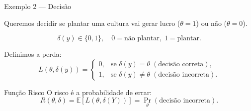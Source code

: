 \documentclass[12pt]{beamer}
\begin{document}
\begin{frame}{Exemplo 2 — Decisão}

	\begin{block}{}
		\justifying
		Queremos decidir se plantar uma cultura vai gerar lucro ($\theta=1$) ou não ($\theta=0$). 
		
		\[
		\delta(y) \in \{0,1\}, \quad 0=\text{não plantar}, \; 1=\text{plantar}.
		\]
		
		Definimos a perda:
		\[
		L(\theta,\delta(y)) =
		\begin{cases}
			0, & \text{se } \delta(y) = \theta \; (\text{decisão correta}), \\[6pt]
			1, & \text{se } \delta(y) \neq \theta \; (\text{decisão incorreta}).
		\end{cases}
		\]
	\end{block}
	\pause
	\begin{block}{Função Risco}
		\justifying
		O risco é a probabilidade de errar:
		\[
		R(\theta,\delta) = \mathbb{E}[L(\theta,\delta(Y))] 
		= \Pr_\theta(\text{decisão incorreta}).
		\]
	\end{block}
\end{frame}


\end{document}

